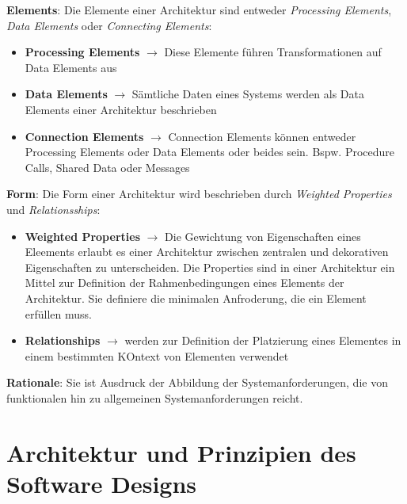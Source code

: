 \documentclass{report}
\theoremstyle{definition}
\theoremstyle{example}
\begin{document}
\textbf{Elements}: Die Elemente einer Architektur sind entweder \textit{Processing Elements}, \textit{Data Elements} oder \textit{Connecting Elements}:
\begin{itemize}
	\item \textbf{Processing Elements} $\rightarrow$ Diese Elemente führen Transformationen auf Data Elements aus
	\item \textbf{Data Elements} $\rightarrow$ Sämtliche Daten eines Systems werden als Data Elements einer Architektur beschrieben
	\item \textbf{Connection Elements} $\rightarrow$ Connection Elements können entweder Processing Elements oder Data Elements oder beides sein. Bspw. Procedure Calls, Shared Data oder Messages
\end{itemize}

\textbf{Form}: Die Form einer Architektur wird beschrieben durch \textit{Weighted Properties} und \textit{Relationsships}:
\begin{itemize}
	\item \textbf{Weighted Properties} $\rightarrow$ Die Gewichtung von Eigenschaften eines Eleements erlaubt es einer Architektur zwischen zentralen und dekorativen Eigenschaften zu unterscheiden. Die Properties sind in einer Architektur ein Mittel zur Definition der Rahmenbedingungen eines Elements der Architektur. Sie definiere die minimalen Anfroderung, die ein Element erfüllen muss.
	\item  \textbf{Relationships} $\rightarrow$ werden zur Definition der Platzierung eines Elementes in einem bestimmten KOntext von Elementen verwendet
\end{itemize}

\textbf{Rationale}: Sie ist Ausdruck der Abbildung der Systemanforderungen, die von funktionalen hin zu allgemeinen Systemanforderungen reicht.

\section{Architektur und Prinzipien des Software Designs}
\end{document}

